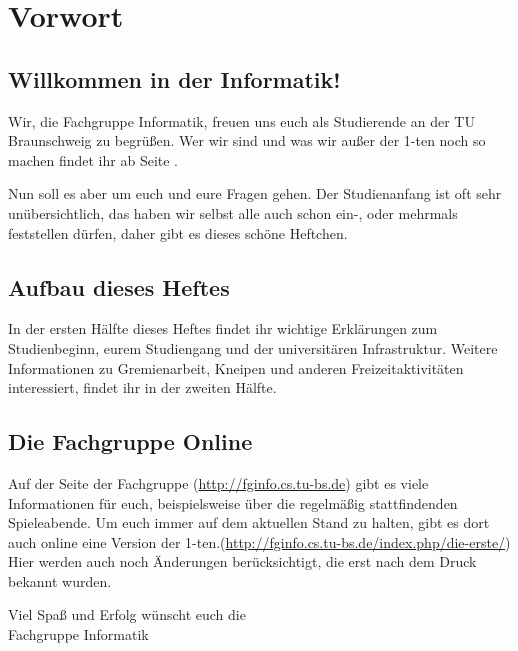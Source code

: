 
\section{Vorwort}
\label{vorwort}
	\begin{multicols}{2}
	\subsection*{Willkommen in der Informatik!}
	Wir, die Fachgruppe Informatik, freuen uns euch als Studierende an der TU Braunschweig zu begrüßen. Wer wir sind und was wir außer der 1-ten noch so machen findet ihr ab Seite \pageref{fachgruppe}.

	Nun soll es aber um euch und eure Fragen gehen. Der Studienanfang ist oft sehr unübersichtlich, das haben wir selbst alle auch schon ein-, oder mehrmals feststellen dürfen, daher gibt es dieses schöne Heftchen.

	\subsection*{Aufbau dieses Heftes}
	In der ersten Hälfte dieses Heftes findet ihr wichtige Erklärungen zum Studienbeginn, eurem Studiengang und der universitären Infrastruktur. Weitere Informationen zu Gremienarbeit, Kneipen und anderen Freizeitaktivitäten interessiert, findet ihr in der zweiten Hälfte.


	\subsection*{Die Fachgruppe Online}

	Auf der Seite der Fachgruppe (\url{http://fginfo.cs.tu-bs.de}) gibt es viele Informationen für euch, beispielsweise über die regelmäßig stattfindenden Spieleabende. 
	Um euch immer auf dem aktuellen Stand zu halten, gibt es dort auch online eine Version der 1-ten.(\url{http://fginfo.cs.tu-bs.de/index.php/die-erste/}) Hier werden auch noch Änderungen berücksichtigt, die erst nach dem Druck bekannt wurden. 

	\vspace*{0.5cm}

	Viel Spaß und Erfolg wünscht euch die\\
	\hspace*{2cm}Fachgruppe Informatik
	\end{multicols}